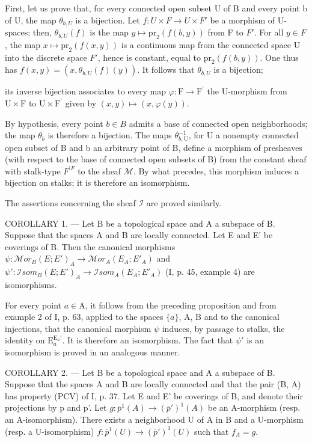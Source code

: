 First, let us prove that, for every connected open subset U of B and every point b of U, the map \(\theta_{b,U}\) is a bijection. Let \(f\colon U\times F\to U\times F'\) be a morphism of U-spaces; then, \(\theta_{b,U}(f)\) is the map \(y\mapsto\mathrm{pr}_{2}(f(b,y))\) from F to \(F'\). For all \(y\in F\), the map \(x\mapsto\mathrm{pr}_{2}(f(x,y))\) is a continuous map from the connected space U into the discrete space \(F'\), hence is constant, equal to \(\mathrm{pr}_{2}(f(b,y))\). One thus has \(f(x,y)=(x,\theta_{b,U}(f)(y))\). It follows that \(\theta_{b,U}\) is a bijection;

its inverse bijection associates to every map \(\varphi\colon\mathrm{F}\to\mathrm{F}^{\prime}\) the U-morphism from \(\mathrm{U}\times\mathrm{F}\) to \(\mathrm{U}\times\mathrm{F}^{\prime}\) given by \((x,y)\mapsto(x,\varphi(y))\).

By hypothesis, every point \(b \in B\) admits a base of connected open neighborhoods; the map \(\theta_{b}\) is therefore a bijection. The maps \(\theta_{b,\mathrm{U}}^{-1}\), for U a nonempty connected open subset of B and b an arbitrary point of B, define a morphism of presheaves (with respect to the base of connected open subsets of B) from the constant sheaf with stalk-type \(F^{\prime F}\) to the sheaf \(\mathcal{M}\). By what precedes, this morphism induces a bijection on stalks; it is therefore an isomorphism.

The assertions concerning the sheaf \(\mathcal{I}\) are proved similarly.

COROLLARY 1. --- Let B be a topological space and A a subspace of B. Suppose that the spaces A and B are locally connected. Let E and E' be coverings of B. Then the canonical morphisms \(\psi\colon\mathcal{M}or_{B}(E;E')_{A}\to\mathcal{M}or_{A}(E_{A};E'_{A})\) and \(\psi'\colon\mathcal{I}som_{B}(E;E')_{A}\to\mathcal{I}som_{A}(E_{A};E'_{A})\) (I, p. 45, example 4) are isomorphisms.

For every point \(a \in \mathrm{A}\), it follows from the preceding proposition and from example 2 of I, p. 63, applied to the spaces \(\{a\}\), A, B and to the canonical injections, that the canonical morphism \(\psi\) induces, by passage to stalks, the identity on \(\mathrm{E}_a^{\mathrm{E}_a'}\). It is therefore an isomorphism. The fact that \(\psi'\) is an isomorphism is proved in an analogous manner.

COROLLARY 2. --- Let B be a topological space and A a subspace of B. Suppose that the spaces A and B are locally connected and that the pair (B, A) has property (PCV) of I, p. 37. Let E and E' be coverings of B, and denote their projections by p and p'. Let \(g: \overline{p}^{1}(A) \to (\overline{p}')^{1}(A)\) be an A-morphism (resp. an A-isomorphism). There exists a neighborhood U of A in B and a U-morphism (resp. a U-isomorphism) \(f: \overline{p}^{1}(U) \to (\overline{p}')^{1}(U)\) such that \(f_{A} = g\).

